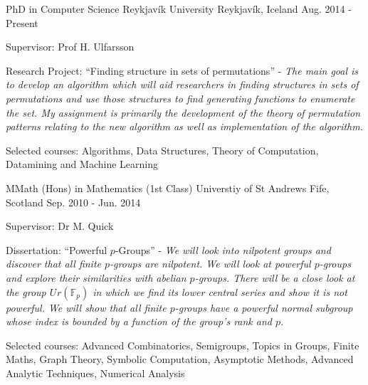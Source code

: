 


\begin{cventries}


  \cventry
  {PhD in Computer Science} %
  {Reykjavík University} %
  {Reykjavík, Iceland} %
  {Aug. 2014 - Present} %
  {
    \begin{cvitems} %
      \item {
      Supervisor: Prof H. Ulfarsson
      }
      \item {
      Research Project: ``Finding structure in sets of permutations'' -
      \textit{The main goal is to develop an algorithm which will aid
      researchers in finding structures in sets of permutations and use those
      structures to find generating functions to enumerate the set. My
      assignment is primarily the development of the theory of permutation
      patterns relating to the new algorithm as well as implementation of the
      algorithm.}
      }
      \item {
      Selected courses: Algorithms, Data Structures, Theory of Computation,
      Datamining and Machine Learning
      }
    \end{cvitems}
  }


  \cventry
    {MMath (Hons) in Mathematics (1st Class)} %
    {Universtiy of St Andrews} %
    {Fife, Scotland} %
    {Sep. 2010 - Jun. 2014} %
    {
      \begin{cvitems} %
        \item {
        Supervisor: Dr M. Quick
        }
        \item {
        Dissertation: ``Powerful $p$-Groups'' - \textit{We will look into
        nilpotent groups and discover that all finite $p$-groups are nilpotent.
        We will look at powerful $p$-groups and explore their similarities with
        abelian $p$-groups. There will be a close look at the group
        $U_­­r(\mathbb{F}_p)$ in which we find its lower central series and show
        it is not powerful. We will show that all finite $p$-groups have a
        powerful normal subgroup whose index is bounded by a function of the
        group's rank and $p$.}
        }
        \item {
        Selected courses: Advanced Combinatorics, Semigroups, Topics in Groups,
        Finite Maths, Graph Theory, Symbolic Computation, Asymptotic Methods,
        Advanced Analytic Techniques, Numerical Analysis
        }
      \end{cvitems}
    }

\end{cventries}
